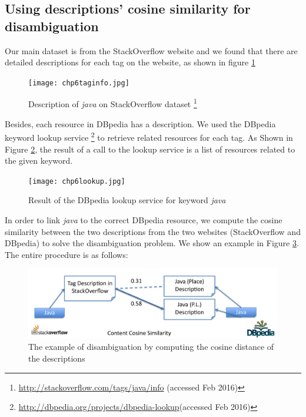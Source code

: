 \subsection{Using descriptions' cosine similarity for disambiguation}
Our main dataset is from the StackOverflow website and we found that there are detailed descriptions for each tag on the website, as shown in figure \ref{fig:chp6taginfo}
\begin{figure}[htp]
\centering
\texttt{[image: chp6taginfo.jpg]}  
\caption{Description of \textit{java} on StackOverflow dataset \footnote{\url{http://stackoverflow.com/tags/java/info} (accessed Feb 2016)}}
\label{fig:chp6taginfo} 
\end{figure}

Besides, each resource in DBpedia has a description.  We used the DBpedia keyword lookup service \footnote{\url{http://dbpedia.org/projects/dbpedia-lookup}(accessed Feb 2016)} to retrieve related resources for each tag. As Shown in Figure \ref{fig:chp6lookup}, the result of a call to the lookup service is a list of resources related to the given keyword.

\begin{figure}[htp]
\centering
\texttt{[image: chp6lookup.jpg]}  
\caption{Result of the DBpedia lookup service for keyword \textit{java}}
\label{fig:chp6lookup} 
\end{figure}

In order to link \textit{java} to the correct DBpedia resource, we compute the cosine similarity between the two descriptions from the two websites (StackOverflow and DBpedia) to solve the disambiguation problem. We show an example in Figure \ref{fig:chp6cosine}. The  entire procedure is as follows:

\begin{figure}[htp]
\centering
\includegraphics[width=5in]{chp6cosine.jpg}  
\caption{The example of disambiguation by computing the cosine distance of the descriptions }
\label{fig:chp6cosine} 
\end{figure}


